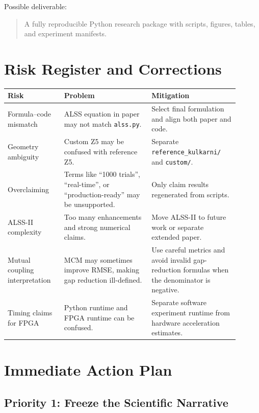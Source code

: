 \documentclass[11pt,letterpaper]{article}
\newcommand{\codepath}[1]{\texttt{#1}}
\begin{document}
Possible deliverable:
\begin{quote}
A fully reproducible Python research package with scripts, figures, tables, and experiment manifests.
\end{quote}

\section{Risk Register and Corrections}

\begin{longtable}{p{0.22\linewidth}p{0.34\linewidth}p{0.34\linewidth}}
\toprule
Risk & Problem & Mitigation \\
\midrule
Formula--code mismatch & ALSS equation in paper may not match \codepath{alss.py}. & Select final formulation and align both paper and code. \\
Geometry ambiguity & Custom Z5 may be confused with reference Z5. & Separate \codepath{reference\_kulkarni/} and \codepath{custom/}. \\
Overclaiming & Terms like ``1000 trials'', ``real-time'', or ``production-ready'' may be unsupported. & Only claim results regenerated from scripts. \\
ALSS-II complexity & Too many enhancements and strong numerical claims. & Move ALSS-II to future work or separate extended paper. \\
Mutual coupling interpretation & MCM may sometimes improve RMSE, making gap reduction ill-defined. & Use careful metrics and avoid invalid gap-reduction formulas when the denominator is negative. \\
Timing claims for FPGA & Python runtime and FPGA runtime can be confused. & Separate software experiment runtime from hardware acceleration estimates. \\
\bottomrule
\end{longtable}

\section{Immediate Action Plan}

\subsection{Priority 1: Freeze the Scientific Narrative}
\end{document}
